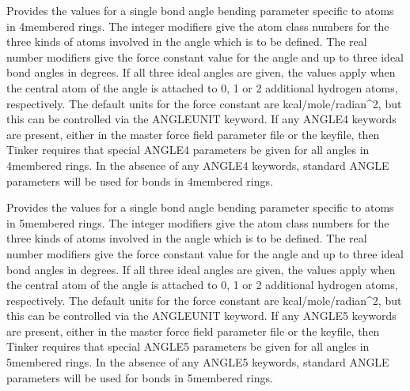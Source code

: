 \documentclass[letterpaper,11pt,english]{sphinxmanual}
\begin{document}
\ignorespaces {}\label{\detokenize{text/keywords:key-angle4}}\begin{description}
\sphinxAtStartPar
Provides the values for a single bond angle bending parameter specific to atoms in 4\sphinxhyphen{}membered rings. The integer modifiers give the atom class numbers for the three kinds of atoms involved in the angle which is to be defined. The real number modifiers give the force constant value for the angle and up to three ideal bond angles in degrees. If all three ideal angles are given, the values apply when the central atom of the angle is attached to 0, 1 or 2 additional hydrogen atoms, respectively. The default units for the force constant are kcal/mole/radian\textasciicircum{}2, but this can be controlled via the ANGLEUNIT keyword. If any ANGLE4 keywords are present, either in the master force field parameter file or the keyfile, then Tinker requires that special ANGLE4 parameters be given for all angles in 4\sphinxhyphen{}membered rings. In the absence of any ANGLE4 keywords, standard ANGLE parameters will be used for bonds in 4\sphinxhyphen{}membered rings.

\end{description}

\ignorespaces {}\label{\detokenize{text/keywords:key-angle5}}\begin{description}
\sphinxAtStartPar
Provides the values for a single bond angle bending parameter specific to atoms in 5\sphinxhyphen{}membered rings. The integer modifiers give the atom class numbers for the three kinds of atoms involved in the angle which is to be defined. The real number modifiers give the force constant value for the angle and up to three ideal bond angles in degrees. If all three ideal angles are given, the values apply when the central atom of the angle is attached to 0, 1 or 2 additional hydrogen atoms, respectively. The default units for the force constant are kcal/mole/radian\textasciicircum{}2, but this can be controlled via the ANGLEUNIT keyword. If any ANGLE5 keywords are present, either in the master force field parameter file or the keyfile, then Tinker requires that special ANGLE5 parameters be given for all angles in 5\sphinxhyphen{}membered rings. In the absence of any ANGLE5 keywords, standard ANGLE parameters will be used for bonds in 5\sphinxhyphen{}membered rings.

\end{description}
\end{document}
